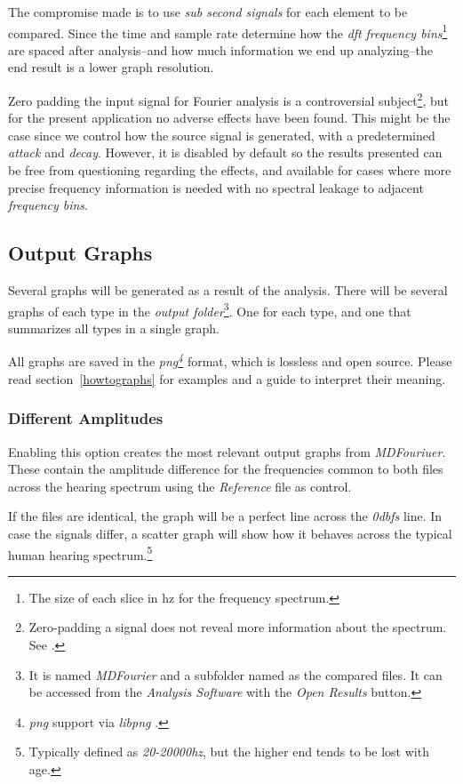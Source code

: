 \documentclass[10pt,a4paper]{report}
\newcommand{\defineCite}[2]{\textit{\acrshort{#1}\footnote{\textit{\acrlong{#1}} #2.}}}
\newcommand{\ac}[1]{\textit{\mbox{\acrshort{#1}}}}
\newcommand{\hz}[1]{\textit{\mbox{#1\acrshort{hz}}}}
\newcommand{\db}[1]{\textit{\mbox{#1\acrshort{dbfs}}}}
\begin{document}
\begin{appendices}
The compromise made is to use \textit{sub second signals} for each element to be compared. Since the time and sample rate determine how the \ac{dft} \textit{frequency bins}\footnote{The size of each slice in \acrlong{hz} for the frequency spectrum.} are spaced after analysis--and how much information we end up analyzing--the end result is a lower graph resolution.

Zero padding the input signal for Fourier analysis is a controversial subject\footnote{Zero-padding a signal does not reveal more information about the spectrum. See \cite{zeropaddinginterpolate} \cite{ZeroPaddingBad}.}, but for the present application no adverse effects have been found. This might be the case since we control how the source signal is generated, with a predetermined \textit{attack} and \textit{decay}. However, it is disabled by default so the results presented can be free from questioning regarding the effects, and available for cases where more precise frequency information is needed with no spectral leakage to adjacent \textit{frequency bins}.

\subsection{Output Graphs}
\label{outputfiles}

Several graphs will be generated as a result of the analysis. There will be several graphs of each type in the \textit{output folder}\footnote{It is named \textit{MDFourier} and a subfolder named as the compared files. It can be accessed from the \textit{Analysis Software} with the \textit{Open Results} button.}. One for each type, and one that summarizes all types in a single graph.

All graphs are saved in the \defineCite{png}{support via \textit{libpng} \cite{libpng}} format, which is lossless and open source. Please read section~\ref{howtographs} for examples and a guide to interpret their meaning. 

\subsubsection{Different Amplitudes}

Enabling this option creates the most relevant output graphs from \textit{MDFouriuer}. These contain the amplitude difference for the frequencies common to both files across the hearing spectrum using the \textit{Reference} file as control.

If the files are identical, the graph will be a perfect line across the \db{0} line. In case the signals differ, a scatter graph will show how it behaves across the typical human hearing spectrum.\footnote{Typically defined as \hz{20-20000}, but the higher end tends to be lost with age.}


\end{appendices}
\end{document}
